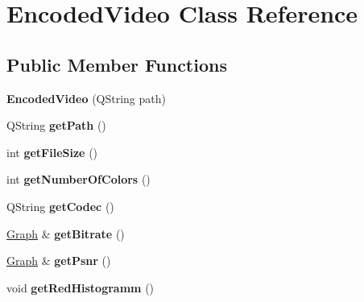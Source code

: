 \hypertarget{classEncodedVideo}{}\section{Encoded\+Video Class Reference}
\label{classEncodedVideo}
\subsection*{Public Member Functions}
\begin{DoxyCompactItemize}
\item 
\hypertarget{classEncodedVideo_a436d811c3c2420e132a2b4e04959c5de}{}{\bfseries Encoded\+Video} (Q\+String path)\label{classEncodedVideo_a436d811c3c2420e132a2b4e04959c5de}

\item 
\hypertarget{classEncodedVideo_a1a94d0c9bf9dd725556721ac914025e3}{}Q\+String {\bfseries get\+Path} ()\label{classEncodedVideo_a1a94d0c9bf9dd725556721ac914025e3}

\item 
\hypertarget{classEncodedVideo_ac4465cfb146410e557acc4892afd9e7c}{}int {\bfseries get\+File\+Size} ()\label{classEncodedVideo_ac4465cfb146410e557acc4892afd9e7c}

\item 
\hypertarget{classEncodedVideo_ab9202ba7e871cc8488f73a14e4e6abef}{}int {\bfseries get\+Number\+Of\+Colors} ()\label{classEncodedVideo_ab9202ba7e871cc8488f73a14e4e6abef}

\item 
\hypertarget{classEncodedVideo_ad0b9ca84489c31d0155646495380ac0b}{}Q\+String {\bfseries get\+Codec} ()\label{classEncodedVideo_ad0b9ca84489c31d0155646495380ac0b}

\item 
\hypertarget{classEncodedVideo_ae58cfec825f873eba6f97325f1f6e594}{}\hyperlink{classGraph}{Graph} \& {\bfseries get\+Bitrate} ()\label{classEncodedVideo_ae58cfec825f873eba6f97325f1f6e594}

\item 
\hypertarget{classEncodedVideo_a1084bd5a17e5626b7b3f80bd389fc233}{}\hyperlink{classGraph}{Graph} \& {\bfseries get\+Psnr} ()\label{classEncodedVideo_a1084bd5a17e5626b7b3f80bd389fc233}

\item 
\hypertarget{classEncodedVideo_a8323d9d826f26ba8b5955b9059df46ff}{}void {\bfseries get\+Red\+Histogramm} ()\label{classEncodedVideo_a8323d9d826f26ba8b5955b9059df46ff}


\end{DoxyCompactItemize}
